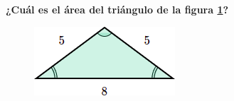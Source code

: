 \begin{multicols}{2}
    \textbf{¿Cuál es el \'area del triángulo de la figura \ref{fig:area_isoseles_03}?}

    \begin{figure}[H]
        \centering
        \includegraphics[width=0.4\linewidth]{../images/area_isoseles_03.png}
        \caption{}
        \label{fig:area_isoseles_03}
    \end{figure}
\end{multicols}\vspace{-0.5cm}
